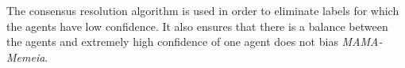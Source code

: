 \documentclass[letterpaper]{article} %
\newcommand{\dataset}{\texttt{RESTOR\textbf{Ex}}}
\newcommand{\model}{\textit{MAMA-Memeia}}
\begin{document}

The consensus resolution algorithm is used in order to eliminate labels for which the agents have low confidence. It also ensures that there is a balance between the agents and extremely high confidence of one agent does not bias \model.

\begin{table}
    \centering
    \caption{Comparison of \model\ with unimodal and multimodal baselines along with previous state-of-the-art. %
    }
    \label{tab:benchmarking}
\end{table}
\end{document}
